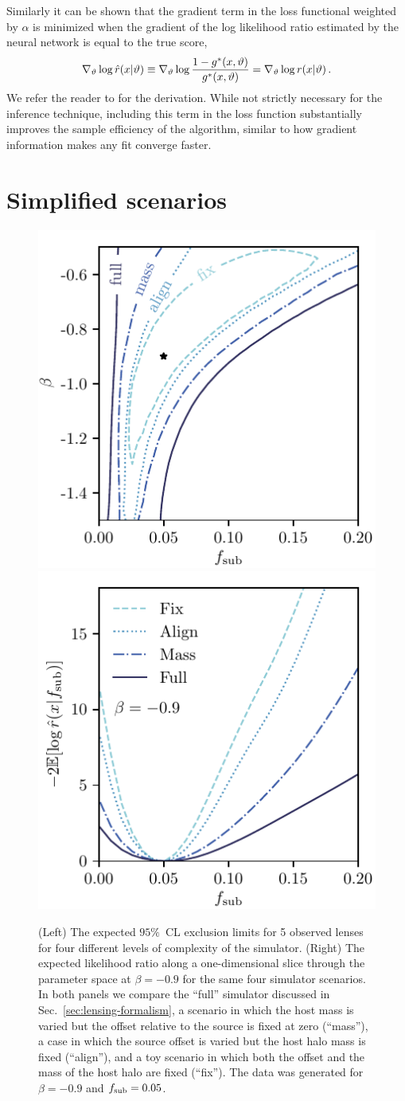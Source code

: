 \documentclass[twocolumn]{aastex62}
\begin{document}
Similarly it can be shown that the gradient term in the loss functional weighted by $\alpha$ is minimized when the gradient of the log likelihood ratio estimated by the neural network is equal to the true score,
%
\begin{equation}
  \nabla_\stattheta \log \hat{r}(x|\stattheta) \equiv \nabla_\stattheta \log \frac {1 - g^*(x, \stattheta)}{g^*(x, \stattheta)} = \nabla_\stattheta \log r(x|\stattheta) \,.
\end{equation}
%
We refer the reader to \citet{1805.00020} for the derivation. While not strictly necessary for the inference technique, including this term in the loss function substantially improves the sample efficiency of the algorithm, similar to how gradient information makes any fit converge faster.


\section{Simplified scenarios}
\label{sec:simplified}

\begin{figure}
\centering
\includegraphics[height=0.4\textwidth]{figures/scenarios_2d}
\includegraphics[height=0.4\textwidth]{figures/scenarios_1d}
\caption{(Left) The expected $95\%$~CL exclusion limits for 5 observed lenses for four different levels of complexity of the simulator. (Right) The expected likelihood ratio along a one-dimensional slice through the parameter space at $\beta = -0.9$ for the same four simulator scenarios. In both panels we compare the ``full'' simulator discussed in Sec.~\ref{sec:lensing-formalism}, a scenario in which the host mass is varied but the offset relative to the source is fixed at zero (``mass''), a case in which the source offset is varied but the host halo mass is fixed (``align''), and a toy scenario in which both the offset and the mass of the host halo are fixed (``fix''). The data was generated for $\beta = -0.9$ and $f_{\mathrm{sub}} = 0.05$.}
\label{fig:scenarios}
\end{figure}
\end{document}
